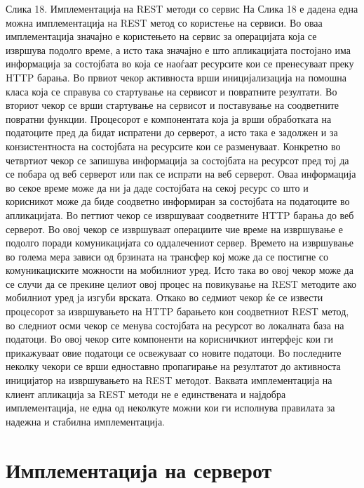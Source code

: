 Слика 18. Имплементација на REST методи со сервис На Слика 18 е дадена една
можна имплементација на REST метод со користење на сервиси. Во оваа
имплементација значајно е користењето на сервис за операцијата која се извршува
подолго време, а исто така значајно е што апликацијата постојано има информација
за состојбата во која се наоѓаат ресурсите кои се пренесуваат преку HTTP барања.
Во првиот чекор активноста врши иницијализација на помошна класа која се
справува со стартување на сервисот и повратните резултати. Во вториот чекор се
врши стартување на сервисот и поставување на соодветните повратни функции.
Процесорот е компонентата која ја врши обработката на податоците пред да бидат
испратени до серверот, а исто така е задолжен и за конзистентноста на состојбата
на ресурсите кои се разменуваат. Конкретно во четвртиот чекор се запишува
информација за состојбата на ресурсот пред тој да се побара од веб серверот или
пак се испрати на веб серверот. Оваа информација во секое време може да ни ја
даде состојбата на секој ресурс со што и корисникот може да биде соодветно
информиран за состојбата на податоците во апликацијата. Во петтиот чекор се
извршуваат соодветните HTTP барања до веб серверот. Во овој чекор се извршуваат
операциите чие време на извршување е подолго поради комуникацијата со
оддалечениот сервер. Времето на извршување во голема мера зависи од брзината на
трансфер кој може да се постигне со комуникациските можности на мобилниот уред.
Исто така во овој чекор може да се случи да се прекине целиот овој процес на
повикување на REST методите ако мобилниот уред ја изгуби врската. Откако во
седмиот чекор ќе се извести процесорот за извршувањето на HTTP барањето кон
соодветниот REST метод, во следниот осми чекор се менува состојбата на ресурсот
во локалната база на податоци. Во овој чекор сите компоненти на корисничкиот
интерфејс кои ги прикажуваат овие податоци се освежуваат со новите податоци. Во
последните неколку чекори се врши едноставно пропагирање на резултатот до
активноста иницијатор на извршувањето на REST методот. Ваквата имплементација на
клиент апликација за REST методи не е единствената и најдобра имплементација, не
една од неколкуте можни кои ги исполнува правилата за надежна и стабилна
имплементација.

\section{Имплементација на серверот} 
 
